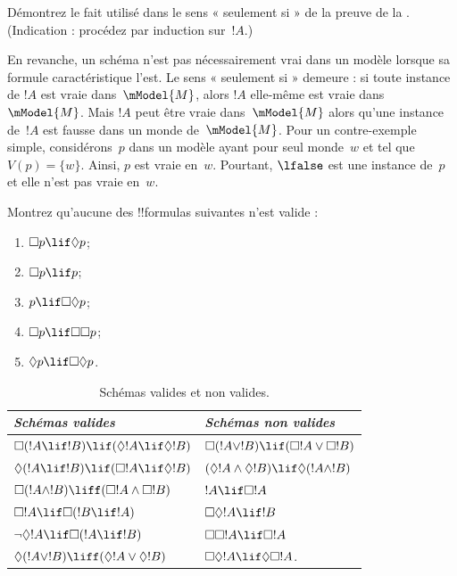\documentclass[../../../include/open-logic-section]{subfiles}
\begin{document}
\begin{prob}
  Démontrez le fait utilisé dans le sens « seulement si » de
  la preuve de la .
  (Indication : procédez par induction sur~$!A$.)
\end{prob}

En revanche, un schéma n'est pas nécessairement vrai dans un
modèle lorsque sa formule caractéristique l'est. Le sens
« seulement si » demeure : si toute instance de $!A$ est vraie
dans~$\mModel{M}$, alors $!A$ elle-même est vraie
dans~$\mModel{M}$.
Mais $!A$ peut être vraie dans~$\mModel{M}$ alors qu'une
instance de~$!A$ est fausse dans un monde de~$\mModel{M}$.
Pour un contre-exemple simple, considérons~$p$ dans un modèle
ayant pour seul monde~$w$ et tel que $V(p) = \{w\}$. Ainsi,
$p$ est vraie en~$w$. Pourtant, $\lfalse$ est une instance
de~$p$ et elle n'est pas vraie en~$w$.

\begin{prob}
  Montrez qu'aucune des !!{formula}s suivantes n'est valide :
  \begin{enumerate}
    \item[\Ax{D}:] \quad $\Box p \lif \Diamond p$;
    \item[\Ax{T}:] \quad $\Box p \lif p$;
    \item[\Ax{B}:] \quad $p \lif \Box\Diamond p$;
    \item[\Ax{4}:] \quad $\Box p \lif \Box \Box p$;
    \item[\Ax{5}:] \quad $\Diamond p \lif \Box \Diamond
      p$.
  \end{enumerate}
\end{prob}

\begin{table}[t]
    \centering
    \begin{tabular}{| l || l |}
      \hline
      {\emph{Schémas valides}} & {\emph{Schémas non valides}} \\
      \hline\hline
      $\Box(!A \lif !B) \lif (\Diamond !A \lif \Diamond !B)$
      & $\Box (!A \lor !B) \lif (\Box !A \lor \Box !B)$ \\
      $\Diamond (!A \lif !B) \lif (\Box !A \lif \Diamond
      !B)$
      & $(\Diamond !A \land \Diamond !B) \lif \Diamond (!A
      \land !B)$\\
      $\Box (!A \land !B) \liff (\Box !A \land \Box !B)$
      & $!A \lif \Box !A$ \\
      $\Box !A \lif \Box (!B \lif !A)$
      & $\Box \Diamond !A \lif !B$ \\
      $\lnot \Diamond !A \lif \Box (!A \lif !B)$
      & $\Box \Box !A \lif \Box !A$ \\
      $\Diamond (!A \lor !B) \liff (\Diamond !A \lor
      \Diamond !B)$
      & $\Box \Diamond !A \lif \Diamond \Box !A$. \\
      \hline
    \end{tabular}
    \caption{Schémas valides et non valides.}
\end{table}
\end{document}
